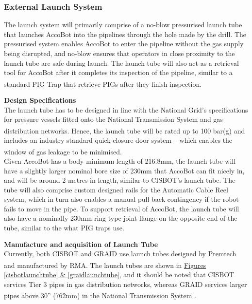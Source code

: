 \documentclass[11pt]{article}		%
\newcommand{\supercite}[1]{\textsuperscript{\cite{#1}}}		%
\begin{document}
		\subsubsection{External Launch System}
	    The launch system will primarily comprise of a no-blow pressurised launch tube that launches AccoBot into the pipelines through the hole made by the drill. The pressurised system enables AccoBot to enter the pipeline without the gas supply being disrupted, and no-blow ensures that operators in close proximity to the launch tube are safe during launch. The launch tube will also act as a retrieval tool for AccoBot after it completes its inspection of the pipeline, similar to a standard PIG Trap that retrieve PIGs after they finish inspection\supercite{pigTrap}. 

    \textbf{Design Specifications}
    \\The launch tube has to be designed in line with the National Grid’s specifications for pressure vessels fitted onto the National Transmission System and gas distribution networks\supercite{NTSstandards}. Hence, the launch tube will be rated up to 100 bar(g) and includes an industry standard quick closure door system – which enables the window of gas leakage to be minimised\supercite{launchtubestandards}.
    \\ \hspace*{3ex}Given AccoBot has a body minimum length of 216.8mm, the launch tube will have a slightly larger nominal bore size of 230mm that AccoBot can fit nicely in, and will be around 2 metres in length, similar to CISBOT’s launch tube. The tube will also comprise custom designed rails for the Automatic Cable Reel system, which in turn also enables a manual pull-back contingency if the robot fails to move in the pipe. To support retrieval of AccoBot, the launch tube will also have a nominally 230mm ring-type-joint flange on the opposite end of the tube, similar to the what PIG traps use. 

    \textbf{Manufacture and acquisition of Launch Tube}
    \\Currently, both CISBOT and GRAID use launch tubes designed by Premtech and manufactured by RMA\supercite{launchtubemfg}.  The launch tubes are shown in \hyperref[cisbotlaunchtube]{Figures \ref*{cisbotlaunchtube} \& \ref*{graidlaunchtube}}, and it should be noted that CISBOT services Tier 3 pipes in gas distribution networks, whereas GRAID services larger pipes above 30” (762mm) in the National Transmission System \supercite{GRAID}. 
\end{document}
